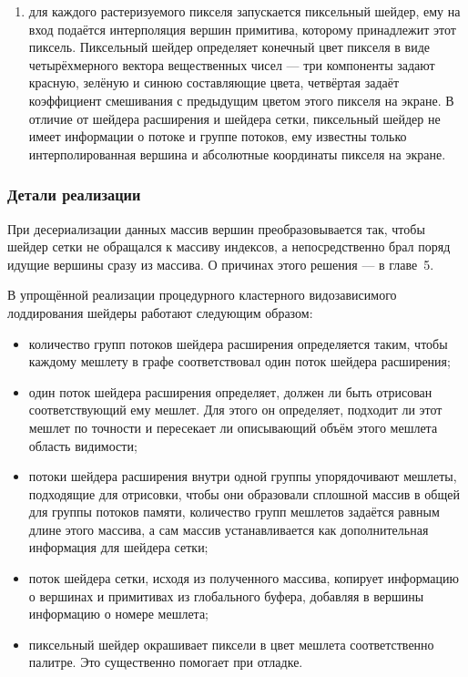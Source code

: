 \begin{enumerate}
    \item для каждого растеризуемого пикселя запускается пиксельный шейдер, ему на вход подаётся интерполяция вершин примитива, которому принадлежит этот пиксель.
    Пиксельный шейдер определяет конечный цвет пикселя в виде четырёхмерного вектора вещественных чисел --- три компоненты задают красную, зелёную и синюю составляющие цвета, четвёртая задаёт коэффициент смешивания с предыдущим цветом этого пикселя на экране.
    В отличие от шейдера расширения и шейдера сетки, пиксельный шейдер не имеет информации о потоке и группе потоков, ему известны только интерполированная вершина и абсолютные координаты пикселя на экране.
\end{enumerate}

\subsubsection*{Детали реализации}
При десериализации данных массив вершин преобразовывается так, чтобы шейдер сетки не обращался к массиву индексов, а непосредственно брал поряд идущие вершины сразу из массива.
О причинах этого решения --- в главе~5.

В упрощённой реализации процедурного кластерного видозависимого лоддирования шейдеры работают следующим образом:
\begin{itemize}
    \item количество групп потоков шейдера расширения определяется таким, чтобы каждому мешлету в графе соответствовал один поток шейдера расширения;
    \item один поток шейдера расширения определяет, должен ли быть отрисован соответствующий ему мешлет.
    Для этого он определяет, подходит ли этот мешлет по точности и пересекает ли описывающий объём этого мешлета область видимости;
    \item потоки шейдера расширения внутри одной группы упорядочивают мешлеты, подходящие для отрисовки, чтобы они образовали сплошной массив в общей для группы потоков памяти, количество групп мешлетов задаётся равным длине этого массива, а сам массив устанавливается как дополнительная информация для шейдера сетки;
    \item поток шейдера сетки, исходя из полученного массива, копирует информацию о вершинах и примитивах из глобального буфера, добавляя в вершины информацию о номере мешлета;
    \item пиксельный шейдер окрашивает пиксели в цвет мешлета соответственно палитре.
    Это существенно помогает при отладке.
\end{itemize}

